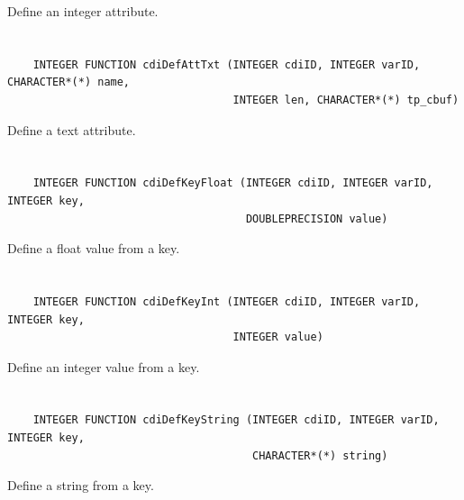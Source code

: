 Define an integer attribute.


\section*{\tt {}}

\begin{verbatim}
    INTEGER FUNCTION cdiDefAttTxt (INTEGER cdiID, INTEGER varID, CHARACTER*(*) name,
                                   INTEGER len, CHARACTER*(*) tp_cbuf)
\end{verbatim}

Define a text attribute.


\section*{\tt {}}

\begin{verbatim}
    INTEGER FUNCTION cdiDefKeyFloat (INTEGER cdiID, INTEGER varID, INTEGER key,
                                     DOUBLEPRECISION value)
\end{verbatim}

Define a float value from a key.


\section*{\tt {}}

\begin{verbatim}
    INTEGER FUNCTION cdiDefKeyInt (INTEGER cdiID, INTEGER varID, INTEGER key,
                                   INTEGER value)
\end{verbatim}

Define an integer value from a key.


\section*{\tt {}}

\begin{verbatim}
    INTEGER FUNCTION cdiDefKeyString (INTEGER cdiID, INTEGER varID, INTEGER key,
                                      CHARACTER*(*) string)
\end{verbatim}

Define a string from a key.


\section*{\tt {}}


